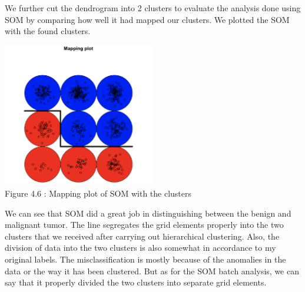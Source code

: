 \documentclass[11pt]{article}
\begin{document}
\begin{enumerate}
We further cut the dendrogram into 2 clusters to evaluate the analysis done using SOM by comparing how well it had mapped our clusters. We plotted the SOM with the found clusters.

\begin{center}
    \includegraphics[width=0.5\textwidth]{4_G.png}
    \\\footnotesize Figure 4.6 : Mapping plot of SOM with the clusters
\end{center}

We can see that SOM did a great job in distinguishing between  the benign and malignant tumor. The line segregates the grid elements properly into the two clusters that we received after carrying out hierarchical clustering. Also, the division of data into the two clusters is also somewhat in accordance to my original labels. The misclassification is mostly because of the anomalies in the data or the way it has been clustered. But as for the SOM batch analysis, we can say that it properly divided the two clusters into separate  grid  elements.  



\end{enumerate}
\end{document}
